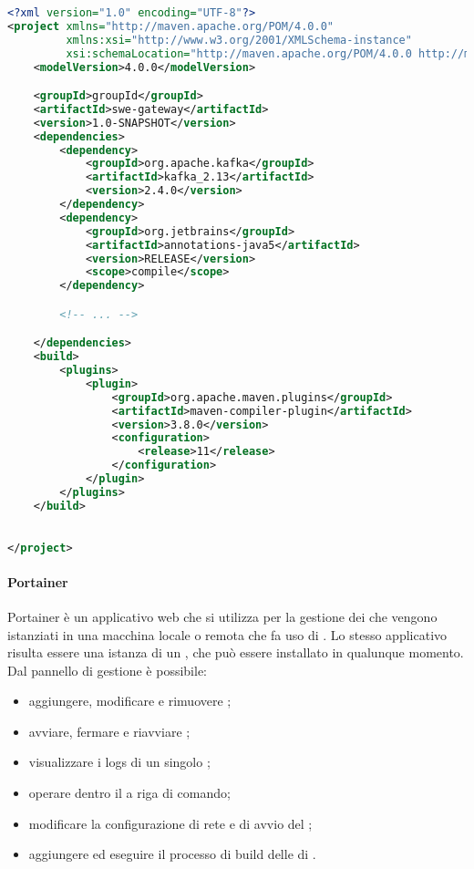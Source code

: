 					\begin{lstlisting}[language=xml,captionpos=b,caption={Esempio di implementazione di un file pom.xml}]
<?xml version="1.0" encoding="UTF-8"?>
<project xmlns="http://maven.apache.org/POM/4.0.0"
         xmlns:xsi="http://www.w3.org/2001/XMLSchema-instance"
         xsi:schemaLocation="http://maven.apache.org/POM/4.0.0 http://maven.apache.org/xsd/maven-4.0.0.xsd">
    <modelVersion>4.0.0</modelVersion>

    <groupId>groupId</groupId>
    <artifactId>swe-gateway</artifactId>
    <version>1.0-SNAPSHOT</version>
    <dependencies>
        <dependency>
            <groupId>org.apache.kafka</groupId>
            <artifactId>kafka_2.13</artifactId>
            <version>2.4.0</version>
        </dependency>
        <dependency>
            <groupId>org.jetbrains</groupId>
            <artifactId>annotations-java5</artifactId>
            <version>RELEASE</version>
            <scope>compile</scope>
        </dependency>

        <!-- ... -->

    </dependencies>
    <build>
        <plugins>
            <plugin>
                <groupId>org.apache.maven.plugins</groupId>
                <artifactId>maven-compiler-plugin</artifactId>
                <version>3.8.0</version>
                <configuration>
                    <release>11</release>
                </configuration>
            </plugin>
        </plugins>
    </build>

    
</project>\end{lstlisting}


				\paragraph{Portainer}
					Portainer è un applicativo web che si utilizza per la gestione dei  che vengono istanziati in una macchina locale o remota che fa uso di . Lo stesso applicativo risulta essere una istanza di un , che può essere installato in qualunque momento. Dal pannello di gestione è possibile:
					\begin{itemize}
						\item aggiungere, modificare e rimuovere ;
						\item avviare, fermare e riavviare ;
						\item visualizzare i logs di un singolo ;
						\item operare dentro il  a riga di comando;
						\item modificare la configurazione di rete e di avvio del ;
						\item aggiungere ed eseguire il processo di build delle  di . 
					\end{itemize}

